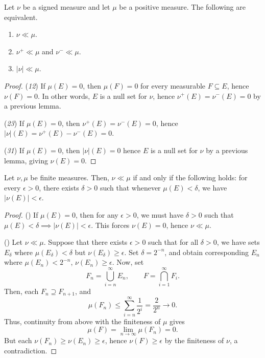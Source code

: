 \documentclass[11pt]{article}
\theoremstyle{definition}
\theoremstyle{remark}
\begin{document}
    \begin{lemma}
        Let $\nu$ be a signed measure and let $\mu$ be a positive measure. The
        following are equivalent. \begin{enumerate}
            \item $\nu \ll \mu$.
            \item $\nu^+ \ll \mu$ and $\nu^- \ll \mu$.
            \item $|\nu| \ll \mu$.
        \end{enumerate}
    \end{lemma}
    \begin{proof}
        (\emph{1}\Rightarrow \emph{2}) If $\mu(E) = 0$, then $\mu(F) = 0$ for every
        measurable $F \subseteq E$, hence $\nu(F) = 0$. In other words, $E$ is a null
        set for $\nu$, hence $\nu^+(E) = \nu^-(E) = 0$ by a previous lemma.


        (\emph{2}\Rightarrow \emph{3}) If $\mu(E) = 0$, then $\nu^+(E) = \nu^-(E) =
        0$, hence $|\nu|(E) = \nu^+(E) - \nu^-(E) = 0$.

        (\emph{3}\Rightarrow \emph{1}) If $\mu(E) = 0$, then $|\nu|(E) = 0$ hence $E$
        is a null set for $\nu$ by a previous lemma, giving $\nu(E) = 0$.
    \end{proof}


    \begin{lemma}
        Let $\nu, \mu$ be finite measures. Then, $\nu \ll \mu$ if and only if the
        following holds: for every $\epsilon > 0$, there exists $\delta > 0$ such
        that whenever $\mu(E) < \delta$, we have $|\nu(E)| < \epsilon$.
    \end{lemma}
    \begin{proof}
        (\Leftarrow) If $\mu(E) = 0$, then for any $\epsilon > 0$, we must have
        $\delta > 0$ such that $\mu(E) < \delta \implies |\nu(E)| < \epsilon$. This
        forces $\nu(E) = 0$, hence $\nu \ll \mu$.

        (\Rightarrow) Let $\nu \ll \mu$. Suppose that there exists $\epsilon > 0$
        such that for all $\delta > 0$, we have sets $E_\delta$ where $\mu(E_\delta)
        < \delta$ but $\nu(E_\delta) \geq \epsilon$. Set $\delta = 2^{-n}$, and
        obtain corresponding $E_n$ where $\mu(E_n) < 2^{-n}$, $\nu(E_n) \geq
        \epsilon$. Now, set \[
            F_n = \bigcup_{i = n}^\infty E_n, \qquad F = \bigcap_{i = 1}^\infty F_i.
        \] Then, each $F_n \supseteq F_{n + 1}$, and \[
            \mu(F_n) \leq \sum_{i = n}^\infty \frac{1}{2^i} = \frac{2}{2^n} \to 0.
        \] Thus, continuity from above with the finiteness of $\mu$ gives \[
            \mu(F) = \lim_{n \to \infty} \mu(F_n) = 0.
        \] But each $\nu(F_n) \geq \nu(E_n) \geq \epsilon$, hence $\nu(F) \geq
        \epsilon$ by the finiteness of $\nu$, a contradiction.
    \end{proof}
\end{document}
